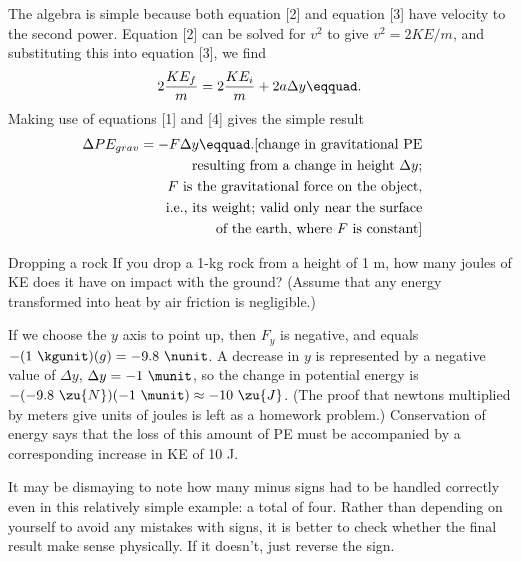 The algebra is simple because both equation [2] and
equation [3] have velocity to the second power. Equation [2]
can be solved for $v^2$ to give $v^2 = 2KE/m$, and
substituting this into equation [3], we find
\begin{equation*}
                2\frac{KE_f}{m}  =  2\frac{KE_i}{m} + 2a\Delta y\eqquad.
\end{equation*}
Making use of equations [1] and [4] gives the simple result
\begin{multline*}
                \Delta PE_{grav}  =  -F\Delta y\eqquad. \hfill
\shoveright{\text{[change in  gravitational PE}}\\
\shoveright{\text{resulting from a change in height $\Delta y$;}}\\
\shoveright{\text{$F$ is the gravitational force on the object,}}\\
\shoveright{\text{i.e., its weight; valid only near the surface}}\\
\shoveright{\text{of the earth, where $F$ is constant]}}\\
\end{multline*}

\vfill

\begin{eg}{Dropping a rock}
\egquestion If you drop a 1-kg rock from a height of 1 m,
how many joules of KE does it have on impact with the
ground? (Assume that any energy transformed into heat by air
friction is negligible.)

\eganswer If we choose the $y$ axis to point up, then $F_y$
is negative, and equals $-(1\ \kgunit)(g)=-9.8\ \nunit$. A decrease
in $y$ is represented by a negative value of $\Delta y$,
$\Delta y=-1\ \munit$, so the change in potential energy is
$-(-9.8\ \zu{N})(-1\ \munit)\approx-10\ \zu{J}$. (The proof that newtons
multiplied by meters give units of joules is left as a
homework problem.) Conservation of energy says that the loss
of this amount of PE must be accompanied by a corresponding
increase in KE of 10 J.
\end{eg}

\vfill

It may be dismaying to note how many minus signs had to be
handled correctly even in this relatively simple example: a
total of four. Rather than depending on yourself to avoid
any mistakes with signs, it is better to check whether the
final result make sense physically. If it doesn't,
just reverse the sign.

